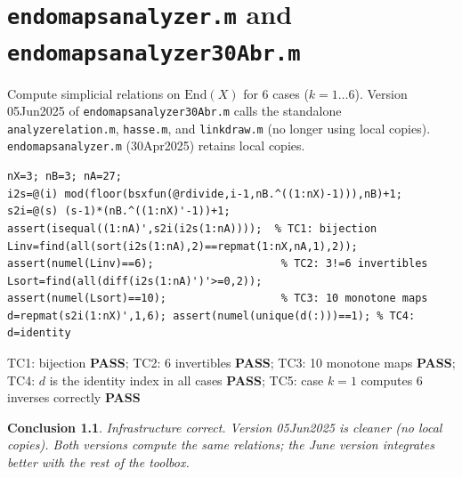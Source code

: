 \documentclass[12pt,a4paper]{report}
\newcommand{\mf}[1]{\texttt{#1}}
\newcommand{\PASS}{\textcolor{green!60!black}{\textbf{PASS}}}
\newtheorem{concl}{Conclusion}[chapter]
\begin{document}
\chapter{\mf{endomapsanalyzer.m} and \mf{endomapsanalyzer30Abr.m}}
\begin{tcolorbox}[Abox,title=Analysis]
Compute simplicial relations on $\mathrm{End}(X)$ for 6 cases ($k=1\ldots6$). Version 05Jun2025 of \mf{endomapsanalyzer30Abr.m} calls the standalone \mf{analyzerelation.m}, \mf{hasse.m}, and \mf{linkdraw.m} (no longer using local copies). \mf{endomapsanalyzer.m} (30Apr2025) retains local copies.
\end{tcolorbox}
\begin{lstlisting}[caption={Tests for endomapsanalyzer.m}]
nX=3; nB=3; nA=27;
i2s=@(i) mod(floor(bsxfun(@rdivide,i-1,nB.^((1:nX)-1))),nB)+1;
s2i=@(s) (s-1)*(nB.^((1:nX)'-1))+1;
assert(isequal((1:nA)',s2i(i2s(1:nA))));  % TC1: bijection
Linv=find(all(sort(i2s(1:nA),2)==repmat(1:nX,nA,1),2));
assert(numel(Linv)==6);                    % TC2: 3!=6 invertibles
Lsort=find(all(diff(i2s(1:nA)')'>=0,2));
assert(numel(Lsort)==10);                  % TC3: 10 monotone maps
d=repmat(s2i(1:nX)',1,6); assert(numel(unique(d(:)))==1); % TC4: d=identity
\end{lstlisting}
\begin{tcolorbox}[Pbox,title=TC1--TC5 -- All pass]
TC1: bijection \PASS; TC2: 6 invertibles \PASS; TC3: 10 monotone maps \PASS; TC4: $d$ is the identity index in all cases \PASS; TC5: case $k=1$ computes 6 inverses correctly \PASS
\end{tcolorbox}
\begin{concl}
Infrastructure correct. Version 05Jun2025 is cleaner (no local copies). Both versions compute the same relations; the June version integrates better with the rest of the toolbox.
\end{concl}

\end{document}
